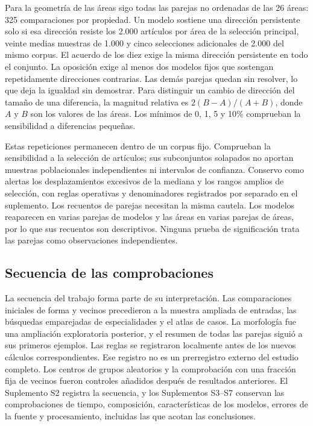 \documentclass[12pt]{article}
\begin{document}
Para la geometría de las áreas sigo todas las parejas no ordenadas de las 26 áreas: 325 comparaciones por propiedad. Un modelo sostiene una dirección persistente solo si esa dirección resiste los 2.000 artículos por área de la selección principal, veinte medias muestras de 1.000 y cinco selecciones adicionales de 2.000 del mismo corpus. El acuerdo de los diez exige la misma dirección persistente en todo el conjunto. La oposición exige al menos dos modelos fijos que sostengan repetidamente direcciones contrarias. Las demás parejas quedan sin resolver, lo que deja la igualdad sin demostrar. Para distinguir un cambio de dirección del tamaño de una diferencia, la magnitud relativa es $2(B-A)/(A+B)$, donde $A$ y $B$ son los valores de las áreas. Los mínimos de 0, 1, 5 y 10\% comprueban la sensibilidad a diferencias pequeñas.

Estas repeticiones permanecen dentro de un corpus fijo. Comprueban la sensibilidad a la selección de artículos; sus subconjuntos solapados no aportan muestras poblacionales independientes ni intervalos de confianza. Conservo como alertas los desplazamientos excesivos de la mediana y los rangos amplios de selección, con reglas operativas y denominadores registrados por separado en el suplemento. Los recuentos de parejas necesitan la misma cautela. Los modelos reaparecen en varias parejas de modelos y las áreas en varias parejas de áreas, por lo que sus recuentos son descriptivos. Ninguna prueba de significación trata las parejas como observaciones independientes.

\subsection{Secuencia de las comprobaciones}
La secuencia del trabajo forma parte de su interpretación. Las comparaciones iniciales de forma y vecinos precedieron a la muestra ampliada de entradas, las búsquedas emparejadas de especialidades y el atlas de casos. La morfología fue una ampliación exploratoria posterior, y el resumen de todas las parejas siguió a sus primeros ejemplos. Las reglas se registraron localmente antes de los nuevos cálculos correspondientes. Ese registro no es un prerregistro externo del estudio completo. Los centros de grupos aleatorios y la comprobación con una fracción fija de vecinos fueron controles añadidos después de resultados anteriores. El Suplemento S2 registra la secuencia, y los Suplementos S3--S7 conservan las comprobaciones de tiempo, composición, características de los modelos, errores de la fuente y procesamiento, incluidas las que acotan las conclusiones.
\end{document}
